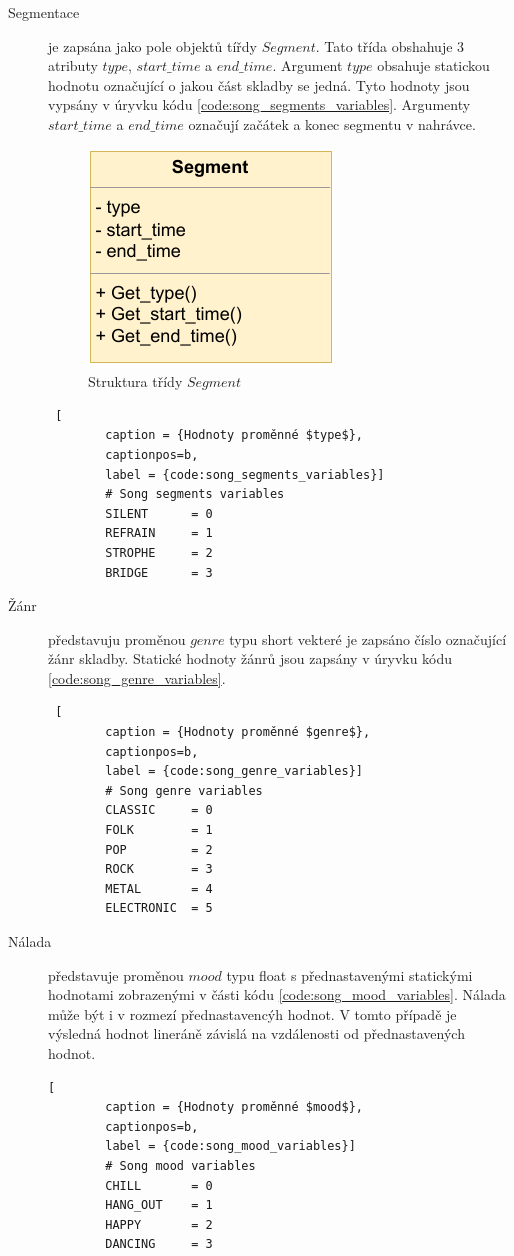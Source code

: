 \begin{description}
    \item[Segmentace] je zapsána jako pole objektů tířdy $Segment$. Tato třída obshahuje 3 atributy $type$, $start\_time$ a $end\_time$. Argument $type$ obsahuje statickou hodnotu označující o jakou část skladby se jedná. Tyto hodnoty jsou vypsány v úryvku kódu \ref{code:song_segments_variables}.
    Argumenty $start\_time$ a $end\_time$ označují začátek a konec segmentu v nahrávce. 

    \begin{figure}[H]
        \centering
        \includegraphics[width = 0.3\linewidth]{obrazky/UML_diagram_Segment.pdf}
        \caption{Struktura třídy $Segment$}
        \label{fig:Loudness_Segment_diagram}
    \end{figure}
    \begin{lstlisting} [
        caption = {Hodnoty proměnné $type$},
        captionpos=b,
        label = {code:song_segments_variables}]
        # Song segments variables
        SILENT      = 0
        REFRAIN     = 1
        STROPHE     = 2
        BRIDGE      = 3
    \end{lstlisting}

    \item[Žánr] představuju proměnou $genre$ typu short vekteré je zapsáno číslo označující žánr skladby. Statické hodnoty žánrů jsou zapsány v úryvku kódu \ref{code:song_genre_variables}.
    \begin{lstlisting} [
        caption = {Hodnoty proměnné $genre$},
        captionpos=b,
        label = {code:song_genre_variables}]
        # Song genre variables
        CLASSIC     = 0
        FOLK        = 1
        POP         = 2
        ROCK        = 3
        METAL       = 4
        ELECTRONIC  = 5
    \end{lstlisting}
    \item[Nálada] představuje proměnou $mood$ typu float s přednastavenými statickými hodnotami zobrazenými v části kódu \ref{code:song_mood_variables}. Nálada může být i v rozmezí přednastavencýh hodnot. V tomto případě je výsledná hodnot lineráně závislá na vzdálenosti od přednastavených hodnot. 
    \begin{lstlisting}[
        caption = {Hodnoty proměnné $mood$},
        captionpos=b,
        label = {code:song_mood_variables}]
        # Song mood variables
        CHILL       = 0
        HANG_OUT    = 1
        HAPPY       = 2
        DANCING     = 3
    \end{lstlisting}
    
\end{description}

